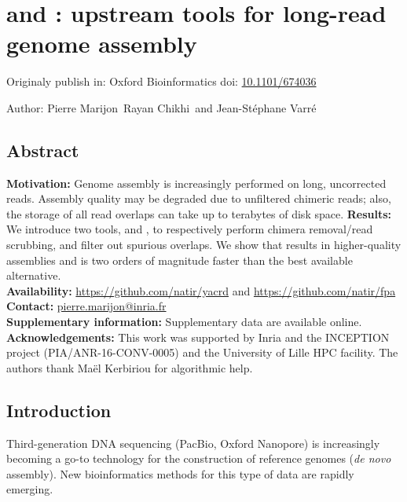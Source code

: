 \documentclass[./main.tex]{subfiles}
\begin{document}
\section{\yacrd and \fpa: upstream tools for long-read genome assembly}\label{section:preassembly:paper}

Originaly publish in: Oxford Bioinformatics doi: \href{https://doi.org/10.1101/674036}{10.1101/674036}

Author: Pierre Marijon\, Rayan Chikhi\, and Jean-St\'ephane Varr\'e\


\subsection{Abstract}

\textbf{Motivation:} Genome assembly is increasingly performed on long, uncorrected reads. Assembly quality may be degraded due to unfiltered chimeric reads; also, the storage of all read overlaps can take up to terabytes of disk space. 
\textbf{Results:} We introduce two tools, \yacrd and \fpa, to respectively perform chimera removal/read scrubbing, and filter out spurious overlaps. We show that \yacrd results in higher-quality assemblies and is two orders of magnitude faster than the best available alternative.\\
\textbf{Availability:} \url{https://github.com/natir/yacrd} and \url{https://github.com/natir/fpa} \\
\textbf{Contact:} \href{pierre.marijon@inria.fr}{pierre.marijon@inria.fr}\\
\textbf{Supplementary information:} Supplementary data are available online.\\
\textbf{Acknowledgements:}
This work was supported by Inria and the INCEPTION project (PIA/ANR-16-CONV-0005) and the University of Lille HPC facility. The authors thank Maël Kerbiriou for algorithmic help.




\subsection{Introduction}

Third-generation DNA sequencing (PacBio, Oxford Nanopore) is increasingly becoming a go-to technology for the construction of reference genomes (\emph{de novo} assembly). New bioinformatics methods for this type of data are rapidly emerging.

\end{document}
